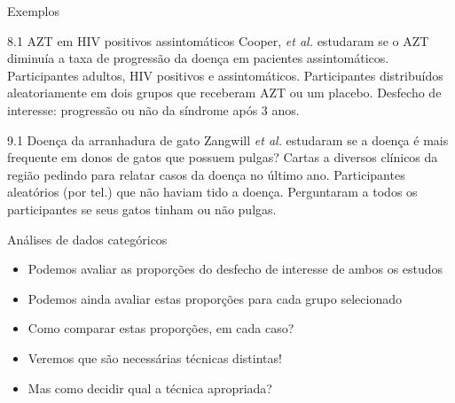 \documentclass{beamer}
\begin{document}
\begin{frame}[label=exemplos8.1-9.1]{\scriptsize Exemplos}
  \begin{exampleblock}{8.1 AZT em HIV positivos assintomáticos}
    \footnotesize
    Cooper, {\em et al.} estudaram se o AZT diminuía a taxa de progressão da doença em pacientes assintomáticos.
    Participantes adultos, HIV positivos e assintomáticos.
    Participantes distribuídos aleatoriamente em dois grupos que receberam AZT ou um placebo.
    Desfecho de interesse: progressão ou não da síndrome após 3 anos.
  \end{exampleblock}
  \begin{exampleblock}{9.1 Doença da arranhadura de gato}
    \footnotesize
    Zangwill {\em et al.} estudaram se a doença é mais frequente em donos de gatos que possuem pulgas?
    Cartas a diversos clínicos da região pedindo para relatar casos da doença no último ano.
    Participantes aleatórios (por tel.) que não haviam tido a doença.
    Perguntaram a todos os participantes se seus gatos tinham ou não pulgas.
  \end{exampleblock}
\end{frame}

\begin{frame}{\scriptsize Análises de dados categóricos}
  \begin{itemize}
    \footnotesize
  \item Podemos avaliar as proporções do desfecho de interesse de ambos os estudos
  \item Podemos ainda avaliar estas proporções para cada grupo selecionado
  \item Como comparar estas proporções, em cada caso?
  \item Veremos que são necessárias técnicas distintas!
  \item Mas como decidir qual a técnica apropriada?
  \end{itemize}
\end{frame}
\end{document}

